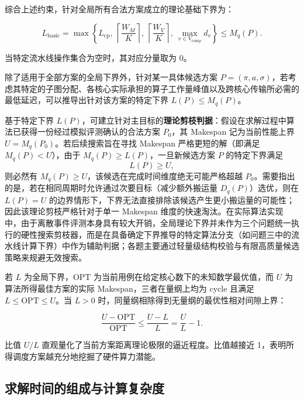 \documentclass[anonymous,notoc]{gmcm2026}
\begin{document}
综合上述约束，针对全局所有合法方案成立的理论基础下界为：

\begin{equation}
L_{\mathrm{basic}} = \max\left\{L_{\mathrm{cp}},\ \left\lceil\frac{W_M}{K}\right\rceil,\ \left\lceil\frac{W_V}{K}\right\rceil,\ \max_{v\in V_{\mathrm{comp}}}d_v\right\} \le M_q(P).
\end{equation}

当特定流水线操作集合为空时，其对应分量取为 0。

除了适用于全部方案的全局下界外，针对某一具体候选方案 \(P = (\pi, a, \sigma)\)，若考虑其特定的子图分配、各核心实际承担的算子工作量峰值以及跨核心传输所必需的最低延迟，可以推导出针对该方案的特定下界 \(L(P) \le M_q(P)\)。

基于特定下界 \(L(P)\)，可建立针对主目标的\textbf{理论剪枝判据}：假设在求解过程中算法已获得一份经过模拟评测确认的合法方案 \(P_0\)，其 Makespan 记为当前性能上界 \(U = M_q(P_0)\)。若后续搜索旨在寻找 Makespan 严格更短的解（即满足 \(M_q(P) < U\)），由于 \(M_q(P) \ge L(P)\)，一旦新候选方案 \(P\) 的特定下界满足 \begin{equation}
L(P) \ge U,
\end{equation} 则必然有 \(M_q(P) \ge U\)，该候选在完成时间维度绝无可能严格超越 \(P_0\)。需要指出的是，若在相同周期时允许通过次要目标（减少额外搬运量 \(D_q(P)\)）选优，则在 \(L(P) = U\) 的边界情形下，下界无法直接排除该候选产生更小搬运量的可能性；因此该理论剪枝严格针对于单一 Makespan 维度的快速淘汰。在实际算法实现中，由于离散事件评测本身具有较大开销，全局理论下界并未作为三个问题统一执行的硬性搜索剪枝器，而是在具备确定下界推导的特定算法分支（如问题三中的流水线计算下界）中作为辅助判据；各题主要通过轻量级结构校验与有限高质量候选策略来规避无效搜索。

若 \(L\) 为全局下界，\(\mathrm{OPT}\) 为当前用例在给定核心数下的未知数学最优值，而 \(U\) 为算法所得最佳方案的实际 Makespan，三者在量纲上均为 cycle 且满足 \(L \le \mathrm{OPT} \le U\)。当 \(L > 0\) 时，同量纲相除得到无量纲的最优性相对间隙上界：

\begin{equation}
\frac{U - \mathrm{OPT}}{\mathrm{OPT}} \le \frac{U - L}{L} = \frac{U}{L} - 1.
\end{equation}

比值 \(U/L\) 直观量化了当前方案距离理论极限的逼近程度。比值越接近 1，表明所得调度方案越充分地挖掘了硬件算力潜能。

\subsection{求解时间的组成与计算复杂度}
\end{document}
